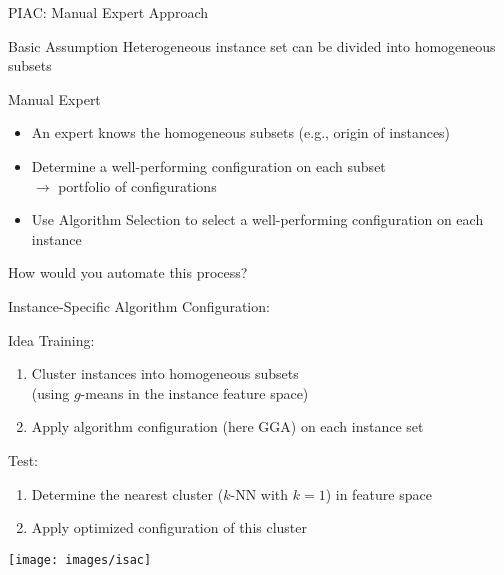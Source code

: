 \begin{frame}[c]{PIAC: Manual Expert Approach}

\begin{block}{Basic Assumption}
Heterogeneous instance set can be divided into homogeneous subsets
\end{block}

\pause
\bigskip

\begin{block}{Manual Expert}
\begin{itemize}
  \item An expert knows the homogeneous subsets (e.g., origin of instances)
  \item Determine a well-performing configuration on each subset\\
  		$\to$ portfolio of configurations
  \item Use Algorithm Selection to select a well-performing configuration on each instance 
\end{itemize}

\end{block}  

\medskip
\pause

How would you automate this process?\hands

\end{frame}
\begin{frame}{Instance-Specific Algorithm Configuration: \isac{}\\ }


\begin{block}{Idea}
Training:
\begin{enumerate}
  \item Cluster instances into homogeneous subsets\\ (using $g$-means in the instance feature space)
  \item Apply algorithm configuration (here GGA) on each instance set
\end{enumerate}

\pause
Test:
\begin{enumerate}
  \item Determine the nearest cluster ($k$-NN with $k=1$) in feature space
  \item Apply optimized configuration of this cluster 
\end{enumerate}
\end{block}

\begin{center}
\texttt{[image: images/isac]}
\end{center}

\end{frame}
